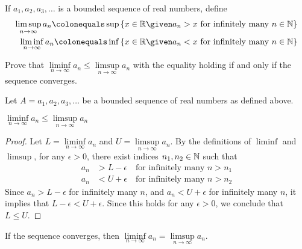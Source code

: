 \begin{problem}
  If $a_1, a_2, a_3, \ldots$ is a bounded sequence of real numbers, define
  \begin{align*}
    \limsup\limits_{n \to \infty}{a_n}
    \colonequals
    \sup \set{x \in \R \given a_n > x \text{ for infinitely many } n \in \N}
    \\
    \liminf\limits_{n \to \infty}{a_n}
    \colonequals
    \inf \set{x \in \R \given a_n < x \text{ for infinitely many } n \in \N}
  \end{align*}

  Prove that $\liminf\limits_{n \to \infty}{a_n} \leq \limsup\limits_{n \to \infty}{a_n}$
  with the equality holding if and only if the sequence converges.
\end{problem}

\begin{answer}
  Let $A = a_1, a_2, a_3, \ldots$ be a bounded sequence of real numbers as defined above.

  \begin{claim}
    $\liminf\limits_{n \to \infty}{a_n} \leq \limsup\limits_{n \to \infty}{a_n}$
    \begin{proof}
      Let $L = \liminf\limits_{n \to \infty}{a_n}$ and $U = \limsup\limits_{n \to \infty}{a_n}$.
      By the definitions of $\liminf$ and $\limsup$, for any $\epsilon > 0$, there exist indices $n_1, n_2 \in \mathbb{N}$ such that
      \begin{align*}
        a_n &> L - \epsilon \quad \text{for infinitely many } n > n_1 \\
        a_n &< U + \epsilon \quad \text{for infinitely many } n > n_2
      \end{align*}
      Since $a_n > L - \epsilon$ for infinitely many $n$, and $a_n < U + \epsilon$ for infinitely many $n$,
      it implies that $L - \epsilon < U + \epsilon$.
      Since this holds for any $\epsilon > 0$, we conclude that $L \leq U$.
    \end{proof}
  \end{claim}

  \newpage
  \begin{claim}
    If the sequence converges, then $\liminf\limits_{n \to \infty}{a_n} = \limsup\limits_{n \to \infty}{a_n}$.


\end{claim}
\end{answer}
